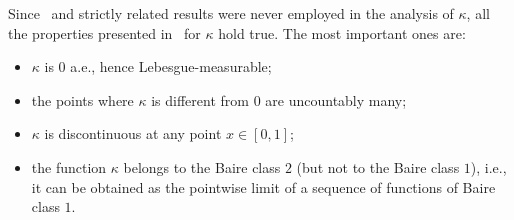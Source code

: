\documentclass[12pt]{article}
\theoremstyle{plain}\newtheorem{teo}{Theorem}
\theoremstyle{plain}\newtheorem{proposition}[teo]{Proposition}
\theoremstyle{plain}\newtheorem{lemma}[teo]{Lemma}
\theoremstyle{plain}\newtheorem{corollary}[teo]{Corollary}
\theoremstyle{plain}\newtheorem{conjecture}[teo]{Conjecture}
\theoremstyle{definition}\newtheorem{definition}[teo]{Definition}
\theoremstyle{remark}\newtheorem{remark}[teo]{Remark}
\theoremstyle{definition}\newtheorem{example}[teo]{Example}
\numberwithin{teo}{section}
\numberwithin{equation}{section}
\begin{document}
Since~\cite[Theorem 7]{Critical} and strictly related
results were never employed in the analysis of $\kappa$,
all the properties presented in~\cite{Critical} for $\kappa$ hold true.
The most important ones are: 
\begin{itemize}
	\item $\kappa$ is $0$ a.e., hence Lebesgue-measurable;
	\item the points where $\kappa$ is different from $0$ 
		are uncountably many;
	\item $\kappa$ is discontinuous at any point $x\in [0,1]$;
	\item the function $\kappa$ belongs to the Baire class $2$
		(but not to the Baire class $1$),
		i.e., it can be obtained as the pointwise limit
		of a sequence of functions of Baire class $1$.
\end{itemize}













\end{document}

